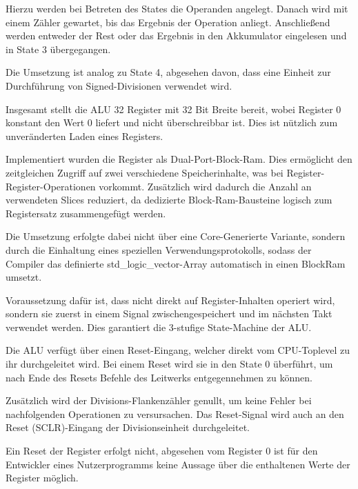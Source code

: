 Hierzu werden bei Betreten des States die Operanden angelegt. Danach wird mit einem Z\"ahler gewartet, bis das Ergebnis der Operation anliegt.
Anschlie\ss{}end werden entweder der Rest oder das Ergebnis in den Akkumulator eingelesen und in State 3 \"ubergegangen.

Die Umsetzung ist analog zu State 4, abgesehen davon, dass eine Einheit zur Durchf\"uhrung von Signed-Divisionen verwendet wird.

Insgesamt stellt die ALU 32 Register mit 32 Bit Breite bereit, wobei Register 0 konstant den Wert 0 liefert und nicht \"uberschreibbar ist. Dies ist n\"utzlich zum unver\"anderten Laden eines Registers.

Implementiert wurden die Register als Dual-Port-Block-Ram. Dies erm\"oglicht den zeitgleichen Zugriff auf zwei verschiedene Speicherinhalte, was bei Register-Register-Operationen vorkommt. Zus\"atzlich wird dadurch die Anzahl an verwendeten Slices reduziert, da dedizierte Block-Ram-Bausteine logisch zum Registersatz zusammengef\"ugt werden.\vspace{10pt}

Die Umsetzung erfolgte dabei nicht \"uber eine Core-Generierte Variante, sondern durch die Einhaltung eines speziellen Verwendungsprotokolls, sodass der Compiler das definierte std\_logic\_vector-Array automatisch in einen BlockRam umsetzt.

Voraussetzung daf\"ur ist, dass nicht direkt auf Register-Inhalten operiert wird, sondern sie zuerst in einem Signal zwischengespeichert und im n\"achsten Takt verwendet werden. Dies garantiert die 3-stufige State-Machine der ALU.

Die ALU verf\"ugt \"uber einen Reset-Eingang, welcher direkt vom CPU-Toplevel zu ihr durchgeleitet wird. Bei einem Reset wird sie in den State 0 \"uberf\"uhrt, um nach Ende des Resets Befehle des Leitwerks entgegennehmen zu k\"onnen.

Zus\"atzlich wird der Divisions-Flankenz\"ahler genullt, um keine Fehler bei nachfolgenden Operationen zu versursachen. Das Reset-Signal wird auch an den Reset (SCLR)-Eingang der Divisionseinheit durchgeleitet.

Ein Reset der Register erfolgt nicht, abgesehen vom Register 0 ist f\"ur den Entwickler eines Nutzerprogramms keine Aussage \"uber die enthaltenen Werte der Register m\"oglich.

